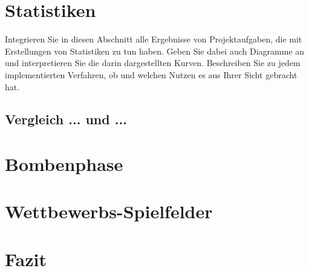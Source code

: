 \documentclass[12pt,a4paper]{article}
\begin{document}
\section{Statistiken}
Integrieren Sie in diesen Abschnitt alle Ergebnisse von Projektaufgaben, die mit Erstellungen von Statistiken zu tun haben. Geben Sie dabei auch Diagramme an und interpretieren Sie die darin dargestellten Kurven. Beschreiben Sie zu jedem implementierten Verfahren, ob und welchen Nutzen es aus Ihrer Sicht gebracht hat.

\subsection{Vergleich ... und ...}

\newpage
\section{Bombenphase}

\newpage
\section{Wettbewerbs-Spielfelder}

\newpage
\section{Fazit}
\end{document}
